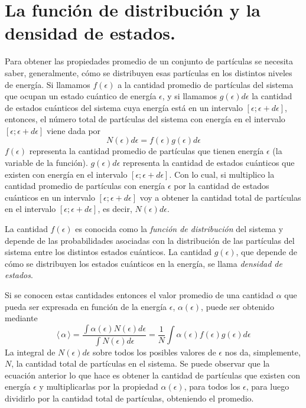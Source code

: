 \documentclass[12pt,a4paper]{article}
\def\e{{\epsilon}} %
\begin{document}
\section{La función de distribución y la densidad de estados.}

Para obtener las propiedades promedio de un conjunto de partículas se necesita saber, generalmente, cómo se distribuyen esas partículas en los distintos niveles de energía. Si llamamos $f(\e)$ a la cantidad promedio de partículas del sistema que ocupan un estado cuántico de energía $\e$, y si llamamos $g(\e)d\e$ la cantidad de estados cuánticos del sistema cuya energía está en un intervalo $[\e;\e+d\e]$, entonces, el número total de partículas del sistema con energía en el intervalo $[\e;\e+d\e]$ viene dada por
\[ N(\e)d\e=f(\e)g(\e)d\e \]
$f(\e)$ representa la cantidad promedio de partículas que tienen energía $\e$ (la variable de la función). $g(\e)d\e$ representa la cantidad de estados cuánticos que existen con energía en el intervalo $[\e;\e+d\e]$. Con lo cual, si multiplico la cantidad promedio de partículas con energía $\e$ por la cantidad de estados cuánticos en un intervalo $[\e;\e+d\e]$ voy a obtener la cantidad total de partículas en el intervalo $[\e;\e+d\e]$, es decir, $N(\e)d\e$.

La cantidad $f(\e)$ es conocida como la \emph{función de distribución} del sistema y depende de las probabilidades asociadas con la distribución de las partículas del sistema entre los distintos estados cuánticos. La cantidad $g(\e)$, que depende de cómo se distribuyen los estados cuánticos en la energía, se llama \emph{densidad de estados}.

Si se conocen estas cantidades entonces el valor promedio de una cantidad $\alpha$ que pueda ser expresada en función de la energía $\e$, $\alpha (\e)$, puede ser obtenido mediante
\[ \langle \, \alpha \, \rangle=\dfrac{\int \alpha (\e) N(\e) d\e}{\int N(\e)d\e}= \frac{1}{N} \int \alpha (\e) f(\e) g(\e) d\e \]
La integral de $N(\e)d\e$ sobre todos los posibles valores de $\e$ nos da, simplemente, $N$, la cantidad total de partículas en el sistema. Se puede observar que la ecuación anterior lo que hace es obtener la cantidad de partículas que existen con energía $\e$ y multiplicarlas por la propiedad $\alpha (\e)$, para todos los $\e$, para luego dividirlo por la cantidad total de partículas, obteniendo el promedio.
\end{document}
